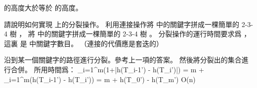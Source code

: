  的高度大於等於  的高度。
\stopANSWER

\startigBase[continue]\startitem
請說明如何實現  上的分裂操作。
利用連接操作將  中的關鍵字拼成一棵簡單的 2-3-4 樹 ，
將  中的關鍵字拼成一棵簡單的 2-3-4 樹 。
分裂操作的運行時間要求爲 ，
這裏  是  中關鍵字數目。
（\hint 連接的代價應是套迭的）
\stopitem\stopigBase

\startANSWER
沿到某一個關鍵字的路徑進行分裂。參考上一項的答案。
然後將分裂出的集合進行合併。
所用時間爲：
\startformula
\sum_{i=1}^{m}(1+|h(T_{i-1}') - h(T_i')|)
= m + \sum_{i=1}^{m}(h(T_{i-1}') - h(T_i'))
= m + h(T_0') - h(T_m')
\in O(\lg n)
\stopformula
\stopANSWER

\stopPROBLEM
